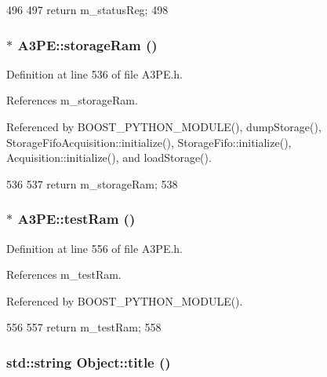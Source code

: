 \begin{DoxyCode}
496                        {
497     return m_statusReg;
498   }
\end{DoxyCode}
\hypertarget{classA3PE_af241373059bad4a3c376ab2ac98a7b29}{
\subsubsection[{storageRam}]{$\ast$ A3PE::storageRam ()}}
\label{classA3PE_af241373059bad4a3c376ab2ac98a7b29}


Definition at line 536 of file A3PE.h.

References m\_\-storageRam.

Referenced by BOOST\_\-PYTHON\_\-MODULE(), dumpStorage(), StorageFifoAcquisition::initialize(), StorageFifo::initialize(), Acquisition::initialize(), and loadStorage().


\begin{DoxyCode}
536                    {
537     return m_storageRam;
538   }
\end{DoxyCode}
\hypertarget{classA3PE_a9327d0bd2efb5baa7c6b7de27bbc5997}{
\subsubsection[{testRam}]{$\ast$ A3PE::testRam ()}}
\label{classA3PE_a9327d0bd2efb5baa7c6b7de27bbc5997}


Definition at line 556 of file A3PE.h.

References m\_\-testRam.

Referenced by BOOST\_\-PYTHON\_\-MODULE().


\begin{DoxyCode}
556                 {
557     return m_testRam;
558   }
\end{DoxyCode}
\hypertarget{classObject_a73a0f1a41828fdd8303dd662446fb6c3}{
\subsubsection[{title}]{\setlength{\rightskip}{0pt plus 5cm}std::string Object::title ()}}
\label{classObject_a73a0f1a41828fdd8303dd662446fb6c3}


